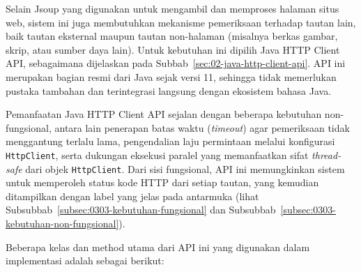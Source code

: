 
Selain Jsoup yang digunakan untuk mengambil dan memproses halaman situs web, sistem ini juga membutuhkan mekanisme pemeriksaan terhadap tautan lain, baik tautan eksternal maupun tautan non-halaman (misalnya berkas gambar, skrip, atau sumber daya lain). Untuk kebutuhan ini dipilih Java HTTP Client API, sebagaimana dijelaskan pada Subbab~\ref{sec:02-java-http-client-api}. API ini merupakan bagian resmi dari Java sejak versi 11, sehingga tidak memerlukan pustaka tambahan dan terintegrasi langsung dengan ekosistem bahasa Java.  

Pemanfaatan Java HTTP Client API sejalan dengan beberapa kebutuhan non-fungsional, antara lain penerapan batas waktu (\textit{timeout}) agar pemeriksaan tidak menggantung terlalu lama, pengendalian laju permintaan melalui konfigurasi \texttt{HttpClient}, serta dukungan eksekusi paralel yang memanfaatkan sifat \textit{thread-safe} dari objek \texttt{HttpClient}. Dari sisi fungsional, API ini memungkinkan sistem untuk memperoleh status kode HTTP dari setiap tautan, yang kemudian ditampilkan dengan label yang jelas pada antarmuka (lihat Subsubbab~\ref{subsec:0303-kebutuhan-fungsional} dan Subsubbab~\ref{subsec:0303-kebutuhan-non-fungsional}).

Beberapa kelas dan method utama dari API ini yang digunakan dalam implementasi adalah sebagai berikut:


